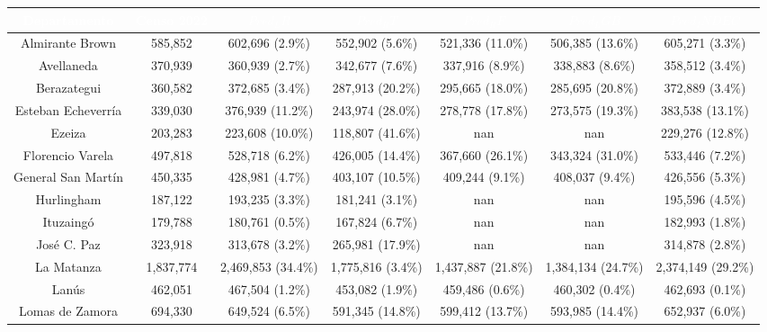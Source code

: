 \begin{table}[htb]
\centering
\begin{tabular}{|c|c|c|c|c|c|c|}
\hline
\textbf{\cellcolor[rgb]{0,0.231,0.427}\textcolor{white}{Departamento}} & \textbf{\cellcolor[rgb]{0,0.231,0.427}\textcolor{white}{Censo 2022}} & \textbf{\cellcolor[rgb]{0,0.231,0.427}\textcolor{white}{$Pred_LR$}} & \textbf{\cellcolor[rgb]{0,0.231,0.427}\textcolor{white}{$Pred_RT$}} & \textbf{\cellcolor[rgb]{0,0.231,0.427}\textcolor{white}{$Pred_RF$}} & \textbf{\cellcolor[rgb]{0,0.231,0.427}\textcolor{white}{$Pred_LGB$}} & \textbf{\cellcolor[rgb]{0,0.231,0.427}\textcolor{white}{$Pred_INDEC$}} \\ \hline
Almirante Brown & 585,852 & 602,696 (2.9\%) & 552,902 (5.6\%) & 521,336 (11.0\%) & 506,385 (13.6\%) & 605,271 (3.3\%) \\
Avellaneda & 370,939 & 360,939 (2.7\%) & 342,677 (7.6\%) & 337,916 (8.9\%) & 338,883 (8.6\%) & 358,512 (3.4\%) \\
Berazategui & 360,582 & 372,685 (3.4\%) & 287,913 (20.2\%) & 295,665 (18.0\%) & 285,695 (20.8\%) & 372,889 (3.4\%) \\
Esteban Echeverría & 339,030 & 376,939 (11.2\%) & 243,974 (28.0\%) & 278,778 (17.8\%) & 273,575 (19.3\%) & 383,538 (13.1\%) \\
Ezeiza & 203,283 & 223,608 (10.0\%) & 118,807 (41.6\%) & nan & nan & 229,276 (12.8\%) \\
Florencio Varela & 497,818 & 528,718 (6.2\%) & 426,005 (14.4\%) & 367,660 (26.1\%) & 343,324 (31.0\%) & 533,446 (7.2\%) \\
General San Martín & 450,335 & 428,981 (4.7\%) & 403,107 (10.5\%) & 409,244 (9.1\%) & 408,037 (9.4\%) & 426,556 (5.3\%) \\
Hurlingham & 187,122 & 193,235 (3.3\%) & 181,241 (3.1\%) & nan & nan & 195,596 (4.5\%) \\
Ituzaingó & 179,788 & 180,761 (0.5\%) & 167,824 (6.7\%) & nan & nan & 182,993 (1.8\%) \\
José C. Paz & 323,918 & 313,678 (3.2\%) & 265,981 (17.9\%) & nan & nan & 314,878 (2.8\%) \\
La Matanza & 1,837,774 & 2,469,853 (34.4\%) & 1,775,816 (3.4\%) & 1,437,887 (21.8\%) & 1,384,134 (24.7\%) & 2,374,149 (29.2\%) \\
Lanús & 462,051 & 467,504 (1.2\%) & 453,082 (1.9\%) & 459,486 (0.6\%) & 460,302 (0.4\%) & 462,693 (0.1\%) \\
Lomas de Zamora & 694,330 & 649,524 (6.5\%) & 591,345 (14.8\%) & 599,412 (13.7\%) & 593,985 (14.4\%) & 652,937 (6.0\%) \\

\end{tabular}
\end{table}
